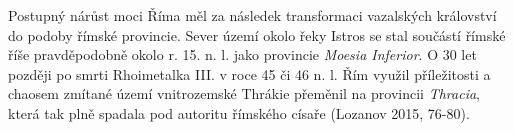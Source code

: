 Postupný nárůst moci Říma měl za následek transformaci vazalských království do podoby římské provincie. Sever území okolo řeky Istros se stal součástí římské říše pravděpodobně okolo r. 15. n. l. jako provincie {\em Moesia Inferior}. O 30 let později po smrti Rhoimetalka III. v roce 45 či 46 n. l. Řím využil příležitosti a chaosem zmítané území vnitrozemské Thrákie přeměnil na provincii {\em Thracia}, která tak plně spadala pod autoritu římského císaře (Lozanov 2015, 76-80).

